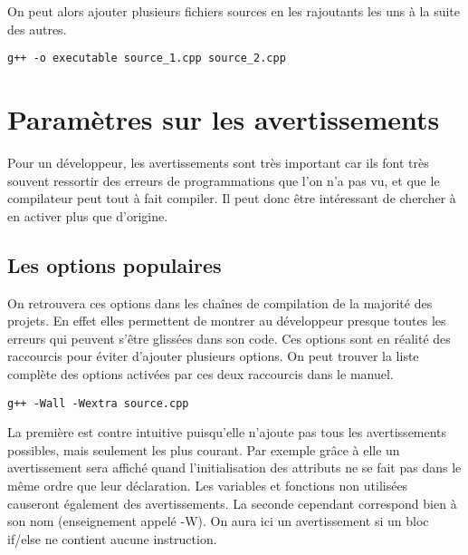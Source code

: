 \documentclass[a4paper, 12pt]{article}
\begin{document}
    On peut alors ajouter plusieurs fichiers sources en les rajoutants les uns à la suite des autres.
    \begin{mdframed}[backgroundcolor=light-gray, roundcorner=20pt,
        innerleftmargin=20, innertopmargin=1, innerbottommargin=1, 
        outerlinewidth=1, linecolor=darkgray]
        \begin{lstlisting}
g++ -o executable source_1.cpp source_2.cpp
        \end{lstlisting}
    \end{mdframed}

\section{Paramètres sur les avertissements}
    Pour un développeur, les avertissements sont très important car ils font très souvent ressortir des erreurs de programmations que l'on n'a pas vu, et que le compilateur peut tout à fait compiler.
    Il peut donc être intéressant de chercher à en activer plus que d'origine.
    \subsection{Les options populaires}
        On retrouvera ces options dans les chaînes de compilation de la majorité des projets. En effet elles permettent de montrer au développeur presque toutes les erreurs qui peuvent s'être glissées dans son code.
        Ces options sont en réalité des raccourcis pour éviter d'ajouter plusieurs options. On peut trouver la liste complète des options activées par ces deux raccourcis dans le manuel.
        \begin{mdframed}[backgroundcolor=light-gray, roundcorner=20pt,
            innerleftmargin=20, innertopmargin=1, innerbottommargin=1, 
            outerlinewidth=1, linecolor=darkgray]
            \begin{lstlisting}
g++ -Wall -Wextra source.cpp
            \end{lstlisting}
        \end{mdframed}
        La première est contre intuitive puisqu'elle n'ajoute pas tous les avertissements possibles, mais seulement les plus courant.
        Par exemple grâce à elle un avertissement sera affiché quand l'initialisation des attributs ne se fait pas dans le même ordre que leur déclaration.
        Les variables et fonctions non utilisées causeront également des avertissements.
        La seconde cependant correspond bien à son nom (enseignement appelé -W). On aura ici un avertissement si un bloc if/else ne contient aucune instruction.
\end{document}
